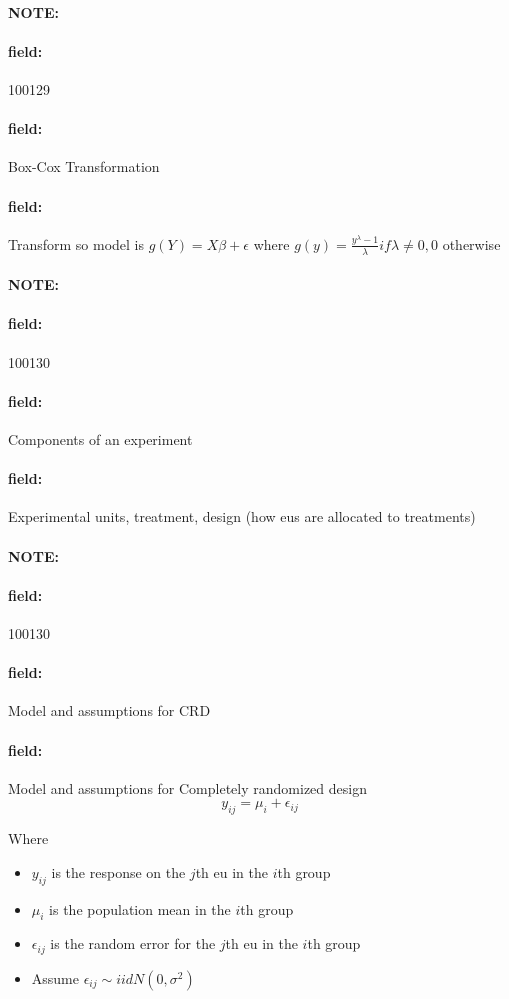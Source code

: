 \documentclass[12pt]{article}
\newenvironment{note}{\paragraph{NOTE:}}{}
\newenvironment{field}{\paragraph{field:}}{}
\begin{document}
\begin{note} \begin{field} \tiny 100129 \end{field}
 \begin{field}
  Box-Cox Transformation
 \end{field}
 \begin{field}
  Transform so model is $g(Y) = X\beta + \epsilon$
  where $g(y) = \frac{y^\lambda -1}{\lambda} if \lambda \neq 0, 0 $ otherwise
 \end{field}
\end{note}




\begin{note}
 \begin{field}
  \tiny 100130
 \end{field}
 \begin{field}
   Components of an experiment
 \end{field}
 \begin{field}
    Experimental units, treatment, design (how eus are allocated to treatments)
 \end{field}
\end{note}



\begin{note}
\begin{field}
  \tiny 100130
\end{field}
\begin{field}
  Model and assumptions for CRD
\end{field}
\begin{field}
  Model and assumptions for Completely randomized design
  $$y_{ij} = \mu_i + \epsilon_{ij}$$

  Where
  \begin{itemize}
    \item $y_{ij}$ is the response on the $j$th eu in the $i$th group
    \item $\mu_i$ is the population mean in the $i$th group
    \item $\epsilon_{ij}$ is the random error for the $j$th eu in the $i$th group
    \item Assume $\epsilon_{ij} \sim iid N(0,\sigma^2)$
  \end{itemize}
\end{field}
\end{note}
\end{document}
